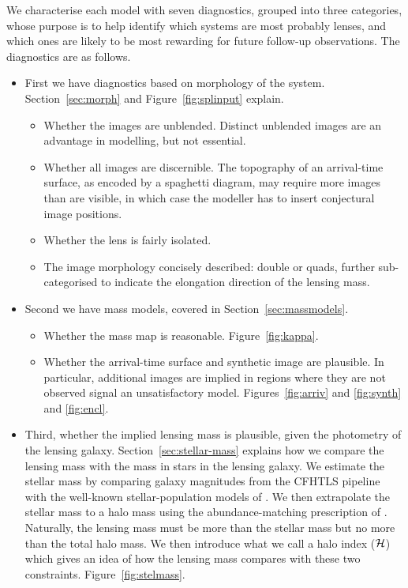 We characterise each model with seven diagnostics, grouped into three 
categories, whose purpose is to help identify which systems are most probably 
lenses, and which ones are likely to be most rewarding for future follow-up 
observations. The diagnostics are as follows.

\begin{itemize}
\item First we have diagnostics based on morphology of the
  system.
  Section~\ref{sec:morph} and Figure~\ref{fig:splinput} explain.
\begin{itemize}
\item Whether the images are unblended.  Distinct unblended images are
  an advantage in modelling, but not essential.
\item Whether all images are discernible.  The topography of an
  arrival-time surface, as encoded by a spaghetti diagram, may require
  more images than are visible, in which case the modeller has to
  insert conjectural image positions.
\item Whether the lens is fairly isolated.
\item The image morphology concisely described: double or quads,
  further sub-categorised to indicate the elongation direction of the
  lensing mass.
\end{itemize}
\item Second we have mass models, covered in Section~\ref{sec:massmodels}.
\begin{itemize}
\item Whether the mass map is reasonable. Figure~\ref{fig:kappa}.
\item Whether the arrival-time surface and synthetic image are
  plausible.  In particular, additional images are implied in regions
  where they are not observed signal an unsatisfactory model.
  Figures~\ref{fig:arriv} and \ref{fig:synth} and \ref{fig:encl}.
\end{itemize}
\item Third, whether the implied lensing mass is plausible, given the
  photometry of the lensing galaxy.  Section~\ref{sec:stellar-mass}
  explains how we compare the lensing mass with the mass in stars in
  the lensing galaxy.  We estimate the stellar mass by comparing
  galaxy magnitudes from the CFHTLS pipeline with the well-known
  stellar-population models of \cite{2003MNRAS.344.1000B}.  We then
  extrapolate the stellar mass to a halo mass using the
  abundance-matching prescription of \cite{2010ApJ...710..903M}.
  Naturally, the lensing mass must be more than the stellar mass but
  no more than the total halo mass.  We then introduce what we call a
  halo index ($\mathcal{H}$) which gives an idea of how the lensing mass
  compares with these two constraints.  Figure~\ref{fig:stelmass}.
\end{itemize}

